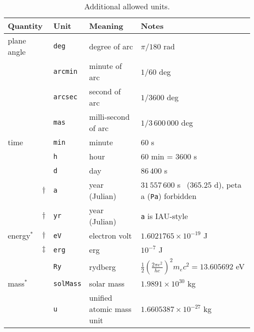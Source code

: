 \documentclass[onecolumn]{aa}
\begin{document}
\begin{table*}
\renewcommand{\arraystretch}{.8}
\tabcolsep 1mm
\caption[Additional allowed units.]{Additional allowed units.}
\begin{center}
\protect\begin{tabular}{lclll}
\hline \hline
\multicolumn{2}{l}{Quantity} &
\multicolumn{1}{l}{Unit} & \multicolumn{1}{l}{Meaning
                        \rule[0mm]{0mm}{3mm}} 
                        & \multicolumn{1}{l}{Notes} \\  
\hline
plane angle\rule{0mm}{3mm}
               &      & \verb+deg+      & degree of arc         
                      & $\pi/180$ rad \\
               &      & \verb+arcmin+   & minute of arc
                      & $1/60$ deg \\
               &      & \verb+arcsec+   & second of arc
                      & $1/3600$ deg \\
               &      & \verb+mas+     & milli-second of arc
                      & $1/3\,600\,000$ deg \\
time           &      & \verb+min+        & minute & 60 s \\
               &      & \verb+h+        & hour & 60 min = 3600 s \\
               &      & \verb+d+        & day 
                      & $86\,400$ s\\
               &$\dag$& \verb+a+        & year (Julian)
                      & $31\,557\,600$ s ~(365.25 d), peta a
                       (\verb+Pa+) forbidden\\
               &$\dag$& \verb+yr+        & year (Julian)
                      & \verb+a+ is IAU-style \\
energy$^*$     &$\dag$& \verb+eV+        & electron volt
                      & $1.6021765\times10^{-19}$ J \\
               &$\ddag$& \verb+erg+        & erg
                      & $10^{-7}$ J \\
               &      & \verb+Ry+       & rydberg
                      & $\frac{1}{2}\left(\frac{2\pi e^2}{hc}\right)^2
                          m_ec^2  = 13.605692 $ eV \\
mass$^*$       &      &\verb+solMass+   & solar mass
                      & $1.9891\times10^{30}$ kg \\
               &      &\verb+u+         & unified atomic mass unit
                      &$1.6605387\times10^{-27}$ kg \\

\end{tabular}
\end{center}
\end{table*}
\end{document}
